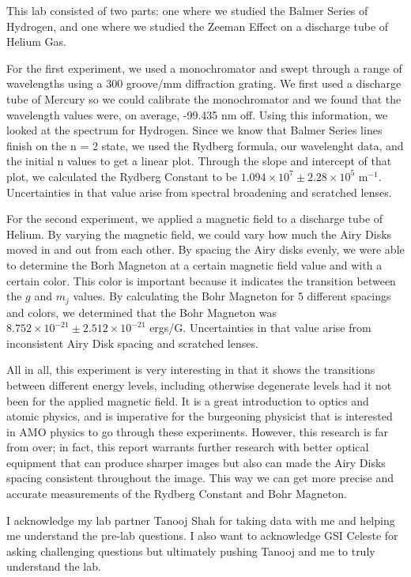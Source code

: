 This lab consisted of two parts: one where we studied the Balmer Series of Hydrogen, and one where we studied the Zeeman Effect on a discharge tube of Helium Gas. 

For the first experiment, we used a monochromator and swept through a range of wavelengths using a 300 groove/mm diffraction grating. We first used a discharge tube of Mercury so we could calibrate the monochromator and we found that the wavelength values were, on average, -99.435 nm off. Using this information, we looked at the spectrum for Hydrogen. Since we know that Balmer Series lines finish on the n = 2 state, we used the Rydberg formula, our wavelenght data, and the initial n values to get a linear plot. Through the slope and intercept of that plot, we calculated the Rydberg Constant to be $1.094 \times 10^{7} \pm 2.28 \times 10^{5} $ m$^{-1}$. Uncertainties in that value arise from spectral broadening and scratched lenses. 

For the second experiment, we applied a magnetic field to a discharge tube of Helium. By varying the magnetic field, we could vary how much the Airy Disks moved in and out from each other. By spacing the Airy disks evenly, we were able to determine the Borh Magneton at a certain magnetic field value and with a certain color. This color is important because it indicates the transition between the $g$ and $m_{j}$ values. By calculating the Bohr Magneton for 5 different spacings and colors, we determined that the Bohr Magneton was $8.752 \times 10^{-21} \pm 2.512 \times 10^{-21}$ ergs/G. Uncertainties in that value arise from inconsistent Airy Disk spacing and scratched lenses.

All in all, this experiment is very interesting in that it shows the transitions between different energy levels, including otherwise degenerate levels had it not been for the applied magnetic field. It is a great introduction to optics and atomic physics, and is imperative for the burgeoning physicist that is interested in AMO physics to go through these experiments. However, this research is far from over; in fact, this report warrants further research with better optical equipment that can produce sharper images but also can made the Airy Disks spacing consistent throughout the image. This way we can get more precise and accurate measurements of the Rydberg Constant and Bohr Magneton.


\begin{acknowledgments} I acknowledge my lab partner Tanooj Shah for taking data with me and helping me understand the pre-lab questions. I also want to acknowledge GSI Celeste for asking challenging questions but ultimately pushing Tanooj and me to truly understand the lab.
\end{acknowledgments}

